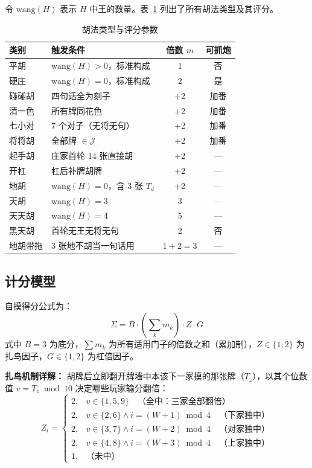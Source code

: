 \documentclass[11pt,a4paper]{article}
\begin{document}
令 $\text{wang}(H)$ 表示 $H$ 中王的数量。表~\ref{tab:hutype} 列出了所有胡法类型及其评分。

\begin{table}[H]
\centering
\caption{胡法类型与评分参数}
\label{tab:hutype}
\small
\begin{tabular}{@{}llcc@{}}
\toprule
\textbf{类别} & \textbf{触发条件} & \textbf{倍数 $m$} & \textbf{可抓炮} \\
\midrule
平胡      & $\text{wang}(H) > 0$，标准构成 & 1 & 否 \\
硬庄      & $\text{wang}(H) = 0$，标准构成 & 2 & 是 \\
碰碰胡    & 四句话全为刻子 & +2 & 加番 \\
清一色    & 所有牌同花色 & +2 & 加番 \\
七小对    & 7 个对子（无将无句） & +2 & 加番 \\
将将胡    & 全部牌 $\in \mathcal{J}$ & +2 & 加番 \\
起手胡    & 庄家首轮 14 张直接胡 & +2 & — \\
开杠      & 杠后补牌胡牌 & +2 & — \\
地胡      & $\text{wang}(H)=0$，含 3 张 $T_d$ & +2 & — \\
天胡      & $\text{wang}(H)=3$ & 3 & — \\
天天胡    & $\text{wang}(H)=4$ & 5 & — \\
黑天胡    & 首轮无王无将无句 & 2 & 否 \\
地胡带拖  & 3 张地不胡当一句话用 & $1+2=3$ & — \\
\bottomrule
\end{tabular}
\end{table}

\subsection{计分模型}

自摸得分公式为：
\begin{equation}
  \Sigma = B \cdot \left(\sum_{k} m_k\right) \cdot Z \cdot G
\end{equation}
式中 $B=3$ 为底分，$\sum m_k$ 为所有适用门子的倍数之和（累加制），$Z\in\{1,2\}$ 为扎鸟因子，$G\in\{1,2\}$ 为杠倍因子。

\textbf{扎鸟机制详解：} 胡牌后立即翻开牌墙中本该下一家摸的那张牌（$T_z$），以其个位数值 $v = T_z \bmod 10$ 决定哪些玩家输分翻倍：
\begin{equation}
  Z_i = \begin{cases}
    2, & v \in \{1,5,9\} \quad\text{（全中：三家全部翻倍）}\\
    2, & v \in \{2,6\} \land i = (W+1)\bmod 4 \quad\text{（下家独中）}\\
    2, & v \in \{3,7\} \land i = (W+2)\bmod 4 \quad\text{（对家独中）}\\
    2, & v \in \{4,8\} \land i = (W+3)\bmod 4 \quad\text{（上家独中）}\\
    1, & \text{（未中）}
  \end{cases}
\end{equation}
\end{document}
